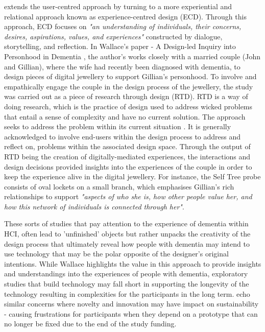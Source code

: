 \cite{wallace_design-led_2013} extends the user-centred approach by turning to a more experiential and relational approach known as experience-centred design (ECD). Through this approach, ECD focuses on \textit{"an understanding of individuals, their concerns, desires, aspirations, values, and experiences"} \citep{morrissey_value_2017} constructed by dialogue, storytelling, and reflection. In Wallace's paper - A Design-led Inquiry into Personhood in Dementia \citep{wallace_design-led_2013}, the author's works closely with a married couple (John and Gillian), where the wife had recently been diagnosed with dementia, to design pieces of digital jewellery to support Gillian's personhood. To involve and empathically engage the couple in the design process of the jewellery, the study was carried out as a piece of research through design (RTD). RTD is a way of doing research, which is the practice of design used to address wicked problems that entail a sense of complexity and have no current solution. The approach seeks to address the problem within its current situation \citep{zimmerman_research_2007}. It is generally acknowledged to involve end-users within the design process to address and reflect on, problems within the associated design space. Through the output of RTD being the creation of digitally-mediated experiences, the interactions and design decisions provided \cite{wallace_design-led_2013} insights into the experiences of the couple in order to keep the experience alive in the digital jewellery. For instance, the Self Tree probe consists of oval lockets on a small branch, which emphasises Gillian's rich relationships to support \textit{"aspects of who she is, how other people value her, and how this network of individuals is connected through her"}.

These sorts of studies that pay attention to the experience of dementia within HCI, often lead to 'unfinished' objects but rather unpacks the creativity of the design process that ultimately reveal how people with dementia may intend to use technology that may be the polar opposite of the designer's original intentions. While Wallace highlights the value in this approach to provide insights and understandings into the experiences of people with dementia, exploratory studies that build technology may fall short in supporting the longevity of the technology resulting in complexities for the participants in the long term. \cite{meurer_designing_2018} echo similar concerns where novelty and innovation may have impact on sustainability - causing frustrations for participants when they depend on a prototype that can no longer be fixed due to the end of the study funding.

